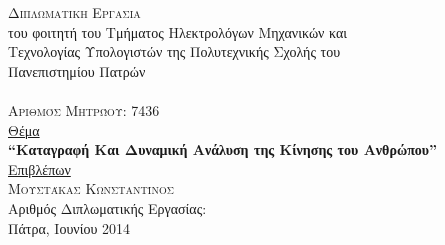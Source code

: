 \hfill
{}
\noindent\makebox[\textwidth]{\rule{\textwidth}{0.4pt}}

\vspace{1.5cm}

\begin{center}
    {\Huge\textsc{Διπλωματικη Εργασια}}\\
    {\Large του φοιτητή του Τμήματος Ηλεκτρολόγων Μηχανικών και\\
    Τεχνολογίας Υπολογιστών της Πολυτεχνικής Σχολής του\\
    Πανεπιστημίου Πατρώ}ν\\[1.5cm]
    {\Large\textsc{}}\\[10pt]
    {\Large\textsc{Αριθμός Μητρώου: 7436}}\\[1.5cm]
    {\Large \uline{Θέμα}}\\
    {\Large\textbf{\textquotedblleft Καταγραφή Και Δυναμική Ανάλυση της Κίνησης του Ανθρώπου\textquotedblright}}\\[1.5cm]
    {\Large \uline{Επιβλέπων}}\\[10pt]
    {\Large\textsc{Μουστάκας Κωνσταντίνος}}\\[1cm]
    {\Large Αριθμός Διπλωματικής Εργασίας:}\\[2cm]
    {\Large{Πάτρα, Ιουνίου 2014}}
\end{center}

